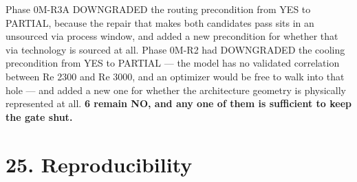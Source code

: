 \documentclass[10pt,]{article}
\begin{document}
Phase 0M-R3A DOWNGRADED the routing precondition from YES to PARTIAL,
because the repair that makes both candidates pass sits in an unsourced
via process window, and added a new precondition for whether that via
technology is sourced at all. Phase 0M-R2 had DOWNGRADED the cooling
precondition from YES to PARTIAL --- the model has no validated
correlation between Re 2300 and Re 3000, and an optimizer would be free
to walk into that hole --- and added a new one for whether the
architecture geometry is physically represented at all. \textbf{6 remain
NO, and any one of them is sufficient to keep the gate shut.}

\newpage

\hypertarget{reproducibility}{%
\section{25. Reproducibility}\label{reproducibility}}
\end{document}
